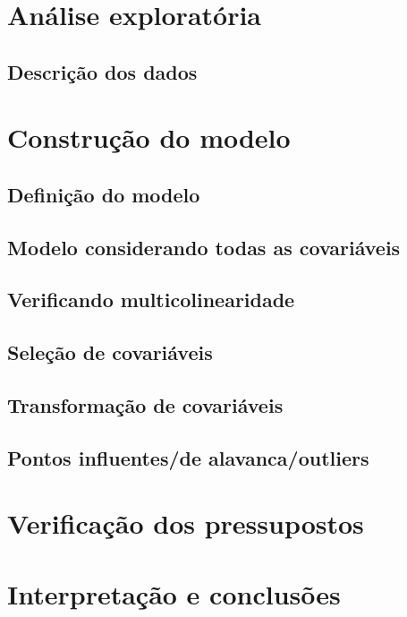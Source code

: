 \documentclass[12pt,a4paper]{article}\usepackage[]{graphicx}\usepackage[]{color}
\begin{document}



\tableofcontents  %




\newpage
\section{{\LARGE\textbf{Análise exploratória}}}


\subsection{\textbf{Descrição dos dados}}


\newpage
\section{{\LARGE\textbf{Construção do modelo}}}

\subsection{\textbf{Definição do modelo}}

\subsection{\textbf{Modelo considerando todas as covariáveis}}

\subsection{\textbf{Verificando multicolinearidade}}




\subsection{\textbf{Seleção de covariáveis}}


\subsection{\textbf{Transformação de covariáveis}}

\newpage
\subsection{\textbf{Pontos influentes/de alavanca/outliers}}

\newpage
\section{{\LARGE\textbf{Verificação dos pressupostos}}}

\newpage
\section{{\LARGE\textbf{Interpretação e conclusões}}}
\end{document}
